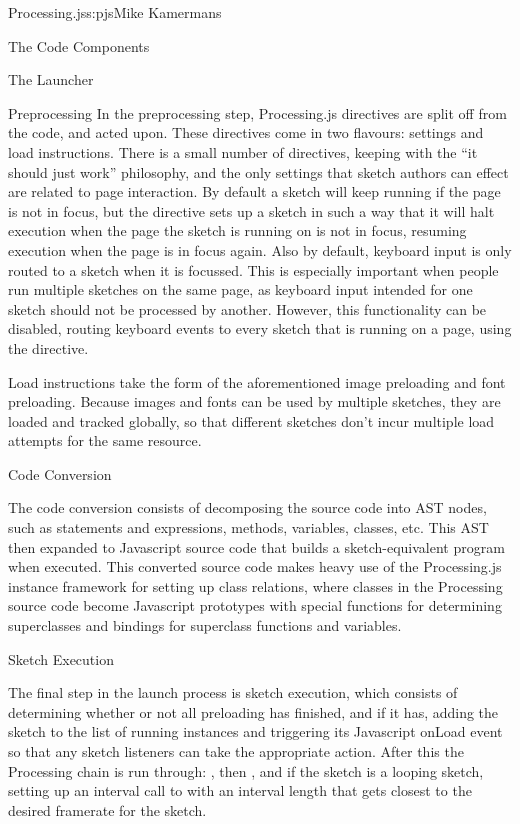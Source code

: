 \begin{aosachapter}{Processing.js}{s:pjs}{Mike Kamermans}
\begin{aosasect1}{The Code Components}
\begin{aosasect2}{The Launcher}
\begin{aosasect3}{Preprocessing}
In the preprocessing step, Processing.js directives are split off from
the code, and acted upon. These directives come in two flavours:
settings and load instructions. There is a small number of directives,
keeping with the ``it should just work'' philosophy, and the only
settings that sketch authors can effect are related to page
interaction. By default a sketch will keep running if the page is not
in focus, but the  directive sets up a sketch in
such a way that it will halt execution when the page the sketch is
running on is not in focus, resuming execution when the page is in
focus again. Also by default, keyboard input is only routed to a
sketch when it is focussed. This is especially important when people
run multiple sketches on the same page, as keyboard input intended for
one sketch should not be processed by another. However, this
functionality can be disabled, routing keyboard events to every sketch
that is running on a page, using the  directive.

Load instructions take the form of the aforementioned image preloading
and font preloading. Because images and fonts can be used by multiple
sketches, they are loaded and tracked globally, so that different
sketches don't incur multiple load attempts for the same resource.

\end{aosasect3}

\begin{aosasect3}{Code Conversion}

The code conversion consists of decomposing the source code into AST
nodes, such as statements and expressions, methods, variables,
classes, etc. This AST then expanded to Javascript source code that
builds a sketch-equivalent program when executed. This converted
source code makes heavy use of the Processing.js instance framework
for setting up class relations, where classes in the Processing source
code become Javascript prototypes with special functions for
determining superclasses and bindings for superclass functions and
variables.

\end{aosasect3}

\begin{aosasect3}{Sketch Execution}

The final step in the launch process is sketch execution, which
consists of determining whether or not all preloading has finished,
and if it has, adding the sketch to the list of running instances
and triggering its Javascript onLoad event so that any sketch
listeners can take the appropriate action. After this the Processing
chain is run through: , then , and if the
sketch is a looping sketch, setting up an interval call to 
with an interval length that gets closest to the desired framerate for
the sketch.


\end{aosasect3}
\end{aosasect2}
\end{aosasect1}
\end{aosachapter}
